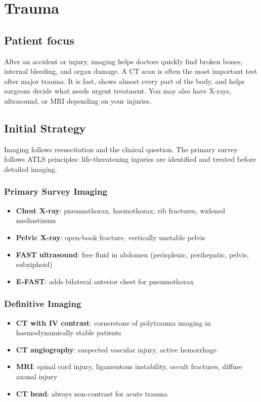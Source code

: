 \chapter{Trauma}

\section*{Patient focus}
After an accident or injury, imaging helps doctors quickly find broken bones, internal bleeding, and organ damage. A CT scan is often the most important test after major trauma. It is fast, shows almost every part of the body, and helps surgeons decide what needs urgent treatment. You may also have X-rays, ultrasound, or MRI depending on your injuries.


\label{ch:ch58_trauma}

\section{Initial Strategy}
Imaging follows resuscitation and the clinical question. The primary survey follows ATLS principles: life-threatening injuries are identified and treated before detailed imaging.

\subsection{Primary Survey Imaging}
\begin{itemize}
  \item \textbf{Chest X-ray}: pneumothorax, haemothorax, rib fractures, widened mediastinum
  \item \textbf{Pelvic X-ray}: open-book fracture, vertically unstable pelvis
  \item \textbf{FAST ultrasound}: free fluid in abdomen (perisplenic, perihepatic, pelvis, subxiphoid)
  \item \textbf{E-FAST}: adds bilateral anterior chest for pneumothorax
\end{itemize}

\subsection{Definitive Imaging}
\begin{itemize}
  \item \textbf{CT with IV contrast}: cornerstone of polytrauma imaging in haemodynamically stable patients
  \item \textbf{CT angiography}: suspected vascular injury, active hemorrhage
  \item \textbf{MRI}: spinal cord injury, ligamentous instability, occult fractures, diffuse axonal injury
  \item \textbf{CT head}: always non-contrast for acute trauma
\end{itemize}

